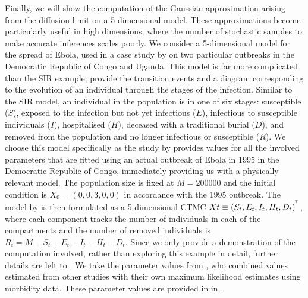 Finally, we will show the computation of the Gaussian approximation arising from the diffusion limit on a 5-dimensional model.
These approximations become particularly useful in high dimensions, where the number of stochastic samples to make accurate inferences scales poorly.
We consider a 5-dimensional model for the spread of Ebola, used in a case study by \citet{LegrandEtAl_2007_UnderstandingDynamicsEbola} on two particular outbreaks in the Democratic Republic of Congo and Uganda.
This model is far more complicated than the SIR example;  provide the transition events and a diagram corresponding to the evolution of an individual through the stages of the infection.
Similar to the SIR model, an individual in the population is in one of six stages: susceptible (\(S\)), exposed to the infection but not yet infectious (\(E\)), infectious to susceptible individuals (\(I\)), hospitalised (\(H\)), deceased with a traditional burial (\(D\)), and removed from the population and no longer infectious or susceptible (\(R\)).
We choose this model specifically as the study by \citet{LegrandEtAl_2007_UnderstandingDynamicsEbola} provides values for all the involved parameters that are fitted using an actual outbreak of Ebola in 1995 in the Democratic Republic of Congo, immediately providing us with a physically relevant model. The population size is fixed at \(M = 200000\) \citep{DowellEtAl_1999_TransmissionEbolaHemorrhagic} and the initial condition is \(X_0 = (0, 0, 3, 0, 0)\) \citep{KhanEtAl_1999_ReemergenceEbolaHemorrhagic} in accordance with the 1995 outbreak.
The model by \citet{LegrandEtAl_2007_UnderstandingDynamicsEbola} is then formulated as a 5-dimensional CTMC \(Xt \equiv \left(S_t, E_t, I_t, H_t, D_t\right)^{^{\!\top}}\), where each component tracks the number of individuals in each of the compartments and the number of removed individuals is \(R_t = M - S_t - E_t - I_t - H_t - D_t\).
Since we only provide a demonstration of the computation involved, rather than exploring this example in detail, further details are left to .
We take the parameter values from \citet{LegrandEtAl_2007_UnderstandingDynamicsEbola}, who combined values estimated from other studies \citep{BwakaEtAl_1999_EbolaHemorrhagicFever,DowellEtAl_1999_TransmissionEbolaHemorrhagic,KhanEtAl_1999_ReemergenceEbolaHemorrhagic,NdambiEtAl_1999_EpidemiologicClinicalAspects,RoweEtAl_1999_ClinicalVirologicImmunologic} with their own maximum likelihood estimates using morbidity data.
These parameter values are provided in  in .

